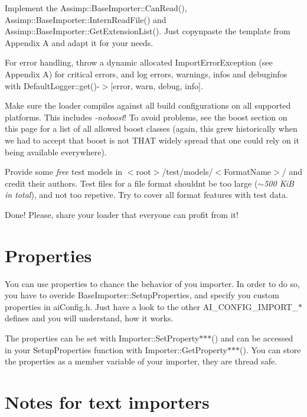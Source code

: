 \begin{DoxyItemize}
\item Implement the Assimp\+::\+Base\+Importer\+::\+Can\+Read(), Assimp\+::\+Base\+Importer\+::\+Intern\+Read\+File() and Assimp\+::\+Base\+Importer\+::\+Get\+Extension\+List(). Just copy\textquotesingle{}n\textquotesingle{}paste the template from Appendix A and adapt it for your needs.  
\item For error handling, throw a dynamic allocated Import\+Error\+Exception (see Appendix A) for critical errors, and log errors, warnings, infos and debuginfos with Default\+Logger\+::get()-\/$>$\mbox{[}error, warn, debug, info\mbox{]}.  
\item Make sure the loader compiles against all build configurations on all supported platforms. This includes {\itshape -\/noboost}! To avoid problems, see the boost section on this page for a list of all \textquotesingle{}allowed\textquotesingle{} boost classes (again, this grew historically when we had to accept that boost is not T\+H\+A\+T widely spread that one could rely on it being available everywhere).  
\item Provide some {\itshape free} test models in {\ttfamily $<$root$>$/test/models/$<$Format\+Name$>$/} and credit their authors. Test files for a file format shouldn\textquotesingle{}t be too large ({\itshape $\sim$500 Ki\+B in total}), and not too repetive. Try to cover all format features with test data.  
\item Done! Please, share your loader that everyone can profit from it!  
\end{DoxyItemize}\hypertarget{extend_properties}{}\section{Properties}\label{extend_properties}
You can use properties to chance the behavior of you importer. In order to do so, you have to overide Base\+Importer\+::\+Setup\+Properties, and specify you custom properties in ai\+Config.\+h. Just have a look to the other A\+I\+\_\+\+C\+O\+N\+F\+I\+G\+\_\+\+I\+M\+P\+O\+R\+T\+\_\+$\ast$ defines and you will understand, how it works.

The properties can be set with Importer\+::\+Set\+Property$\ast$$\ast$$\ast$() and can be accessed in your Setup\+Properties function with Importer\+::\+Get\+Property$\ast$$\ast$$\ast$(). You can store the properties as a member variable of your importer, they are thread safe.\hypertarget{extend_tnote}{}\section{Notes for text importers}\label{extend_tnote}

